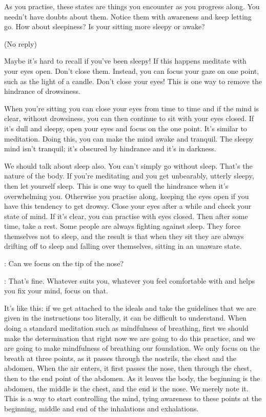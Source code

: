 As you practise, these states are things you encounter as you progress along. You needn't have doubts about them. Notice them with awareness and keep letting go. How about sleepiness? Is your sitting more sleepy or awake? 

(No reply) 

Maybe it's hard to recall if you've been sleepy! If this happens meditate with your eyes open. Don't close them. Instead, you can focus your gaze on one point, such as the light of a candle. Don't close your eyes! This is one way to remove the hindrance of drowsiness. 

When you're sitting you can close your eyes from time to time and if the mind is clear, without drowsiness, you can then continue to sit with your eyes closed. If it's dull and sleepy, open your eyes and focus on the one point. It's similar to  meditation. Doing this, you can make the mind awake and tranquil. The sleepy mind isn't tranquil; it's obscured by hindrance and it's in darkness. 

We should talk about sleep also. You can't simply go without sleep. That's the nature of the body. If you're meditating and you get unbearably, utterly sleepy, then let yourself sleep. This is one way to quell the hindrance when it's overwhelming you. Otherwise you practise along, keeping the eyes open if you have this tendency to get drowsy. Close your eyes after a while and check your state of mind. If it's clear, you can practise with eyes closed. Then after some time, take a rest. Some people are always fighting against sleep. They force themselves not to sleep, and the result is that when they sit they are always drifting off to sleep and falling over themselves, sitting in an unaware state. 

: Can we focus on the tip of the nose?

: That's fine. Whatever suits you, whatever you feel comfortable with and helps you fix your mind, focus on that. 

It's like this: if we get attached to the ideals and take the guidelines that we are given in the instructions too literally, it can be difficult to understand. When doing a standard meditation such as mindfulness of breathing, first we should make the determination that right now we are going to do this practice, and we are going to make mindfulness of breathing our foundation. We only focus on the breath at three points, as it passes through the nostrils, the chest and the abdomen. When the air enters, it first passes the nose, then through the chest, then to the end point of the abdomen. As it leaves the body, the beginning is the abdomen, the middle is the chest, and the end is the nose. We merely note it. This is a way to start controlling the mind, tying awareness to these points at the beginning, middle and end of the inhalations and exhalations. 

